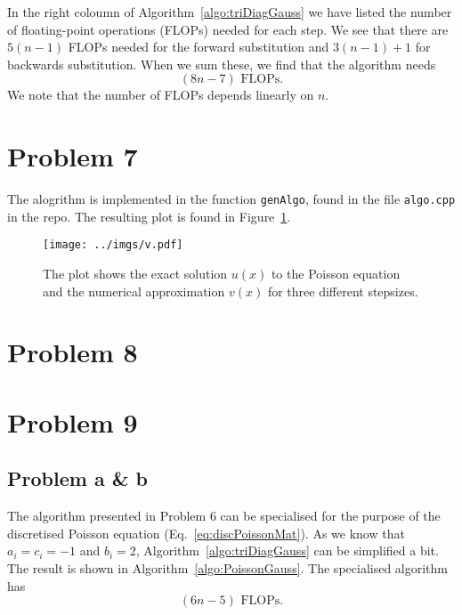 \documentclass[english,notitlepage,aps,pra,10pt]{revtex4-2}
\begin{document}
In the right coloumn of Algorithm~\ref{algo:triDiagGauss} we have listed the number of floating-point operations (FLOPs) needed for each step. We see that there are $5(n-1)$ FLOPs needed for the forward substitution and $3(n-1)+1$ for backwards substitution. When we sum these, we find that the algorithm needs
\begin{equation}
    (8n-7) \textrm{ FLOPs}.
\end{equation} 
We note that the number of FLOPs depends linearly on $n$.


\section*{Problem 7}

The alogrithm is implemented in the function \verb+genAlgo+, found in the file \verb+algo.cpp+ in the repo. The resulting plot is found in Figure~\ref{fig:v}.

\begin{figure}%
    \begin{center}
        \texttt{[image: ../imgs/v.pdf]}
        \caption{The plot shows the exact solution $u(x)$ to the Poisson equation and the numerical approximation $v(x)$ for three different stepsizes.}
        \label{fig:v}
    \end{center}
\end{figure}


\section*{Problem 8}


\section*{Problem 9}

\subsection*{Problem a \& b}

The algorithm presented in Problem 6 can be specialised for the purpose of the discretised Poisson equation (Eq.~\ref{eq:discPoissonMat}). As we know that $a_i = c_i = -1$ and $b_i = 2$, Algorithm~\ref{algo:triDiagGauss} can be simplified a bit. The result is shown in Algorithm~\ref{algo:PoissonGauss}. The specialised algorithm has
\begin{equation}
    (6n-5) \textrm{ FLOPs}.
\end{equation}
\end{document}
